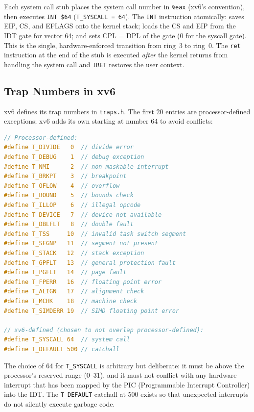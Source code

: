 \documentclass[11pt]{article}
\begin{document}
Each system call stub places the system call number in \texttt{\%eax} (xv6's convention),
then executes \texttt{INT \$64} (\texttt{T\_SYSCALL = 64}). The \texttt{INT} instruction
atomically: saves EIP, CS, and EFLAGS onto the kernel stack; loads the CS and EIP from the
IDT gate for vector 64; and sets CPL = DPL of the gate (0 for the syscall gate). This is
the single, hardware-enforced transition from ring~3 to ring~0. The \texttt{ret} instruction
at the end of the stub is executed \emph{after} the kernel returns from handling the system
call and \texttt{IRET} restores the user context.

\subsection{Trap Numbers in xv6}

xv6 defines its trap numbers in \texttt{traps.h}. The first 20 entries are processor-defined
exceptions; xv6 adds its own starting at number 64 to avoid conflicts:

\begin{lstlisting}[language=C, caption={traps.h --- processor-defined and xv6-defined trap numbers}]
// Processor-defined:
#define T_DIVIDE   0  // divide error
#define T_DEBUG    1  // debug exception
#define T_NMI      2  // non-maskable interrupt
#define T_BRKPT    3  // breakpoint
#define T_OFLOW    4  // overflow
#define T_BOUND    5  // bounds check
#define T_ILLOP    6  // illegal opcode
#define T_DEVICE   7  // device not available
#define T_DBLFLT   8  // double fault
#define T_TSS     10  // invalid task switch segment
#define T_SEGNP   11  // segment not present
#define T_STACK   12  // stack exception
#define T_GPFLT   13  // general protection fault
#define T_PGFLT   14  // page fault
#define T_FPERR   16  // floating point error
#define T_ALIGN   17  // alignment check
#define T_MCHK    18  // machine check
#define T_SIMDERR 19  // SIMD floating point error

// xv6-defined (chosen to not overlap processor-defined):
#define T_SYSCALL 64  // system call
#define T_DEFAULT 500 // catchall
\end{lstlisting}

The choice of 64 for \texttt{T\_SYSCALL} is arbitrary but deliberate: it must be above the
processor's reserved range (0--31), and it must not conflict with any hardware interrupt
that has been mapped by the PIC (Programmable Interrupt Controller) into the IDT. The
\texttt{T\_DEFAULT} catchall at 500 exists so that unexpected interrupts do not silently
execute garbage code.
\end{document}
